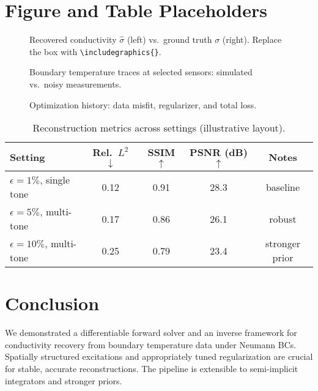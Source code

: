 \documentclass[11pt,a4paper]{article}
\numberwithin{equation}{section}
\begin{document}
\section{Figure and Table Placeholders}

\begin{figure}[H]
  \centering
  \fbox{\rule{0pt}{2.0in}\rule{0.9\textwidth}{0pt}}
  \caption{Recovered conductivity $\hat\sigma$ (left) vs.\ ground truth $\sigma$ (right). Replace the box with \texttt{\textbackslash includegraphics\{\}}.}
  \label{fig:sigma}
\end{figure}

\begin{figure}[H]
  \centering
  \fbox{\rule{0pt}{1.8in}\rule{0.9\textwidth}{0pt}}
  \caption{Boundary temperature traces at selected sensors: simulated vs.\ noisy measurements.}
  \label{fig:traces}
\end{figure}

\begin{figure}[H]
  \centering
  \fbox{\rule{0pt}{1.6in}\rule{0.9\textwidth}{0pt}}
  \caption{Optimization history: data misfit, regularizer, and total loss.}
  \label{fig:history}
\end{figure}

\begin{table}[H]
\centering
\caption{Reconstruction metrics across settings (illustrative layout).}
\label{tab:metrics}
\begin{tabular}{lcccc}
\toprule
Setting & Rel.\ $L^2$ $\downarrow$ & SSIM $\uparrow$ & PSNR (dB) $\uparrow$ & Notes \\
\midrule
$\epsilon=1\%$, single tone & 0.12 & 0.91 & 28.3 & baseline \\
$\epsilon=5\%$, multi-tone   & 0.17 & 0.86 & 26.1 & robust \\
$\epsilon=10\%$, multi-tone  & 0.25 & 0.79 & 23.4 & stronger prior \\
\bottomrule
\end{tabular}
\end{table}

\section*{Conclusion}
We demonstrated a differentiable forward solver and an inverse framework for conductivity recovery from boundary temperature data under Neumann BCs. 
Spatially structured excitations and appropriately tuned regularization are crucial for stable, accurate reconstructions. 
The pipeline is extensible to semi-implicit integrators and stronger priors.
\end{document}
